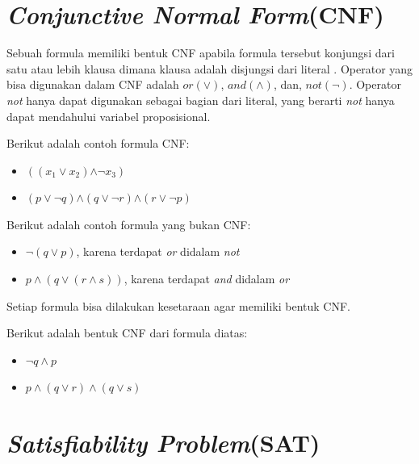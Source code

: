 	

\section{\textit{Conjunctive Normal Form}(CNF)}

Sebuah formula memiliki bentuk CNF apabila formula tersebut konjungsi dari satu atau lebih klausa dimana klausa adalah disjungsi dari literal \cite{huth2004logic}. Operator yang bisa digunakan dalam CNF adalah $\textit{or}\left(\vee\right)$, $\textit{and}\left(\wedge\right)$, dan, $\textit{not}\left(\neg\right)$. Operator \textit{not} hanya dapat digunakan sebagai bagian dari literal, yang berarti \textit{not} hanya dapat mendahului variabel proposisional.

Berikut adalah contoh formula CNF:
\begin{itemize}
	\item $\left(\left(\ensuremath{x_{1}}\ensuremath{\vee}\ensuremath{x_{2}}\right)\ensuremath{\wedge\neg}\ensuremath{x_{3}}\right)$
	\item $\left(p\vee\neg q\right)$$\wedge$$\left(q\vee\neg r\right)$$\wedge$$\left(r\vee\neg p\right)$
\end{itemize}

Berikut adalah contoh formula yang bukan CNF:
\begin{itemize}
	\item $\neg\left(q\vee p\right)$, karena terdapat \textit{or} didalam \textit{not} 
	\item $p\wedge\left(q\vee\left(r\wedge s\right)\right)$, karena terdapat \textit{and} didalam \textit{or}
	
\end{itemize}

Setiap formula bisa dilakukan kesetaraan agar memiliki bentuk CNF. 

Berikut adalah bentuk CNF dari formula diatas:
\begin{itemize}
	\item $\neg q\wedge p$
	\item $p\wedge\left(q\vee r\right)\wedge\left(q\vee s\right)$
\end{itemize}
\section{\textit{Satisfiability Problem}(SAT)}

